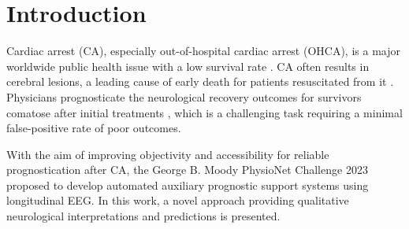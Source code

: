 \section{Introduction}
\label{sec:intro}


Cardiac arrest (CA), especially out-of-hospital cardiac arrest (OHCA), is a major worldwide public health issue with a low survival rate \cite{Yan_2020_Global}. CA often results in cerebral lesions, a leading cause of early death for patients resuscitated from it \cite{Benghanem_2022_Prog}. Physicians prognosticate the neurological recovery outcomes for survivors comatose after initial treatments \cite{Cronberg_2020_Brain}, which is a challenging task requiring a minimal false-positive rate of poor outcomes.

With the aim of improving objectivity and accessibility for reliable prognostication after CA, the George B. Moody PhysioNet Challenge 2023 \cite{Goldberger2000, 2023Challenge} proposed to develop automated auxiliary prognostic support systems using longitudinal EEG. In this work, a novel approach providing qualitative neurological interpretations and predictions is presented.
